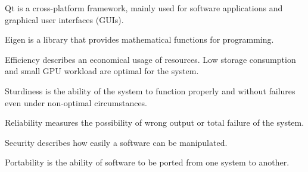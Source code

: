 \begin{aims}
	\item[Qt] is a cross-platform framework, mainly used for software applications and graphical user interfaces (GUIs). 
	\item[Eigen] is a library that provides mathematical functions for programming.
	\item[Efficiency] describes an economical usage of resources. Low storage consumption and small GPU workload are optimal 					  	  for the system.
	\item[Sturdiness] is the ability of the system to function properly and without failures even under non-optimal 								  circumstances. 
	\item[Reliability] measures the possibility of wrong output or total failure of the system.
	\item[Security] describes how easily a software can be manipulated.
	\item[Portability] is the ability of software to be ported from one system to another.

\end{aims}